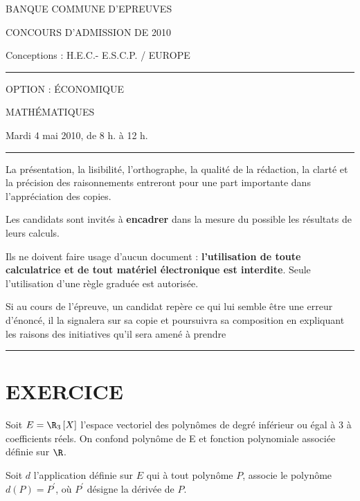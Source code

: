 \documentclass[11pt]{article}%
\begin{document}
\begin{center}
{\LARGE BANQUE COMMUNE D'EPREUVES}

{\large CONCOURS D'ADMISSION DE 2010}

{\large Conceptions : H.E.C.- E.S.C.P. / EUROPE}

\rule{2.39cm}{0.05cm}

{\large OPTION : ÉCONOMIQUE}

{\Huge MATHÉMATIQUES }

Mardi 4 mai 2010, de 8 h. à 12 h.

\rule{2.39cm}{0.05cm}
\end{center}

La présentation, la lisibilité, l'orthographe, la qualité de la
rédaction, la clarté et la précision des raisonnements entreront
pour une part importante dans l'appréciation des copies.

Les candidats sont invités à \textbf{encadrer} dans la mesure du
possible les résultats de leurs calculs.

Ils ne doivent faire usage d'aucun document : \textbf{l'utilisation de
toute
calculatrice et de tout matériel électronique est interdite}. Seule
l'utilisation d'une règle graduée est autorisée.

Si au cours de l'épreuve, un candidat repère ce qui lui semble être une
erreur d'énoncé, il la signalera sur sa copie et poursuivra
sa composition en expliquant les raisons des initiatives qu'il sera
amené
à prendre

\begin{center}
\rule{16.5cm}{0.05cm}
\end{center}

\section*{EXERCICE}

Soit $E = \R_{3}\left[ X\right] $ l'espace vectoriel des polyn\^{o}mes
de degré inférieur ou égal à 3 à coefficients réels.
On confond polyn\^{o}me de E et fonction polynomiale associée définie
sur $\R$.

Soit $d$ l'application définie sur $E$ qui à tout polyn\^{o}me $P$,
associe le polyn\^{o}me $d\left( P\right) = P^{\prime}$, où
$P^{\prime}$ désigne la dérivée de $P$.
\end{document}

